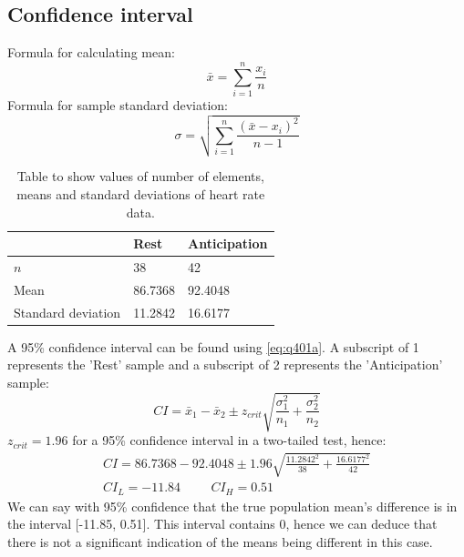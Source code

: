 \documentclass[11pt]{article}
\numberwithin{equation}{section}
\begin{document}
\subsection{Confidence interval}
Formula for calculating mean:
\begin{equation}
    \bar{x} = \sum_{i = 1}^n\frac{x_i}{n}
\end{equation}
Formula for sample standard deviation:
\begin{equation}
    \sigma = \sqrt{\sum_{i = 1}^n \frac{\left(\bar{x} - x_i\right)^2}{n - 1}}
\end{equation}

\begin{table}[H]
    \centering
    \begin{tabular}{lll}
        \toprule
        & \textbf{Rest} & \textbf{Anticipation}\\
        \midrule
        $n$ & 38 & 42\\
        Mean & 86.7368 & 92.4048 \\
        Standard deviation & 11.2842 & 16.6177\\
        \bottomrule
    \end{tabular}
    \caption{Table to show values of number of elements, means and standard deviations of heart rate data.}
\end{table}
A 95\% confidence interval can be found using \ref{eq:q401a}. A subscript of 1 represents the 'Rest' sample and a subscript of 2 represents the 'Anticipation' sample:
\begin{equation}
    CI = \bar{x}_1 - \bar{x}_2 \pm z_{crit} \sqrt{\frac{\sigma_1^2}{n_1} + \frac{\sigma_2^2}{n_2}} \label{eq:q401a}
\end{equation}
$z_{crit} = 1.96$ for a 95\% confidence interval in a two-tailed test, hence:
\begin{gather}
    CI = 86.7368 - 92.4048 \pm 1.96 \sqrt{\frac{11.2842^2}{38} + \frac{16.6177^2}{42}}\\
    CI_L = -11.84 \hspace{1cm} CI_H = 0.51
\end{gather} 
We can say with 95\% confidence that the true population mean's difference is in the interval [-11.85, 0.51]. This interval contains 0, hence we can deduce that there is not a significant indication of the means being different in this case. 
\end{document}
